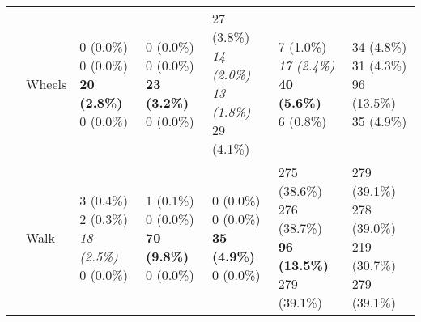 \documentclass[10pt]{article}
\begin{document}
\begin{table}
\begin{center}
\begin{small}
\begin{tabular}{lllllll}
& Wheels      &  \makecell[l]{\textnormal{0 (0.0\%)} \\\textnormal{0 (0.0\%)} \\\textbf{20 (2.8\%)} \\\textnormal{0 (0.0\%)}}      &  \makecell[l]{\textnormal{0 (0.0\%)} \\\textnormal{0 (0.0\%)} \\\textbf{23 (3.2\%)} \\\textnormal{0 (0.0\%)}}      &  \makecell[l]{\textnormal{27 (3.8\%)} \\\textit{14 (2.0\%)} \\\textit{13 (1.8\%)} \\\textnormal{29 (4.1\%)}}      &  \makecell[l]{\textnormal{7 (1.0\%)} \\\textit{17 (2.4\%)} \\\textbf{40 (5.6\%)} \\\textnormal{6 (0.8\%)}}      & \makecell[l]{34 (4.8\%) \\31 (4.3\%) \\96 (13.5\%) \\35 (4.9\%) \\} \\ \cline{2-7}
& Walk      &  \makecell[l]{\textnormal{3 (0.4\%)} \\\textnormal{2 (0.3\%)} \\\textit{18 (2.5\%)} \\\textnormal{0 (0.0\%)}}      &  \makecell[l]{\textnormal{1 (0.1\%)} \\\textnormal{0 (0.0\%)} \\\textbf{70 (9.8\%)} \\\textnormal{0 (0.0\%)}}      &  \makecell[l]{\textnormal{0 (0.0\%)} \\\textnormal{0 (0.0\%)} \\\textbf{35 (4.9\%)} \\\textnormal{0 (0.0\%)}}      &  \makecell[l]{\textnormal{275 (38.6\%)} \\\textnormal{276 (38.7\%)} \\\textbf{96 (13.5\%)} \\\textnormal{279 (39.1\%)}}      & \makecell[l]{279 (39.1\%) \\278 (39.0\%) \\219 (30.7\%) \\279 (39.1\%) \\} \\ \cline{2-7}

\end{tabular}
\end{small}
\end{center}
\end{table}
\end{document}

